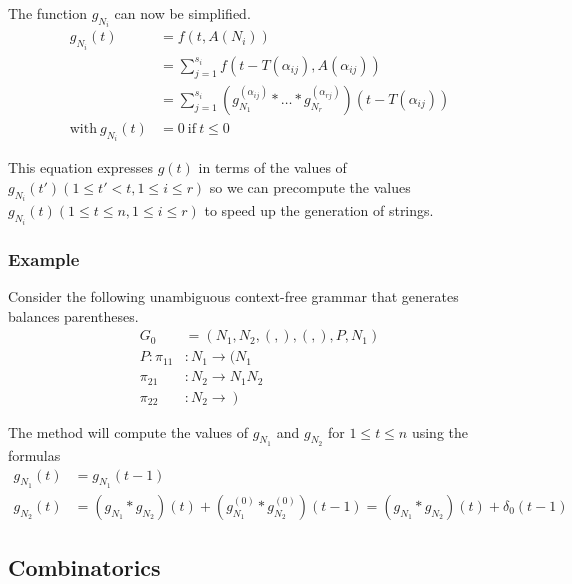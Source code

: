   The function $g_{N_i}$ can now be simplified.
  \begin{align*}
  g_{N_i}(t) &= f(t, A(N_i)) \\
  &= \sum_{j=1}^{s_i} f(t-T(\alpha_{ij}), A(\alpha_{ij})) \\
  &= \sum_{j=1}^{s_i} \left(g_{N_1}^{(\alpha_{ij})} * \hdots * g_{N_r}^{(\alpha_{rj})}\right)(t - T(\alpha_{ij})) \\
  \mathrm{with}\ g_{N_i}(t) &= 0\ \mathrm{if}\ t \leq 0
  \end{align*}

  This equation expresses $g(t)$ in terms of the values of $g_{N_i}(t')(1 \leq t' < t, 1 \leq i \leq r)$ so we can precompute the values $g_{N_i}(t)(1 \leq t \leq n, 1 \leq i \leq r)$ to speed up the generation of strings.

  \subsubsection{Example}

    Consider the following unambiguous context-free grammar that generates balances parentheses.
    \begin{align*}
    G_0 &= ({N_1, N_2, (, )}, {(, )}, P, N_1) \\
    P : \pi_{11} &: N_1 \to (N_1 \\
        \pi_{21} &: N_2 \to N_1 N_2 \\
        \pi_{22} &: N_2 \to\ )
    \end{align*}

    The method will compute the values of $g_{N_1}$ and $g_{N_2}$ for $1 \leq t \leq n$ using the formulas
    \begin{align*}
    g_{N_1}(t) &= g_{N_1}(t-1) \\
    g_{N_2}(t) &= (g_{N_1} * g_{N_2})(t) + (g_{N_1}^{(0)} * g_{N_2}^{(0)})(t-1) = (g_{N_1} * g_{N_2})(t) + \delta_0(t-1)
    \end{align*}

    


  \subsection{Combinatorics}

    